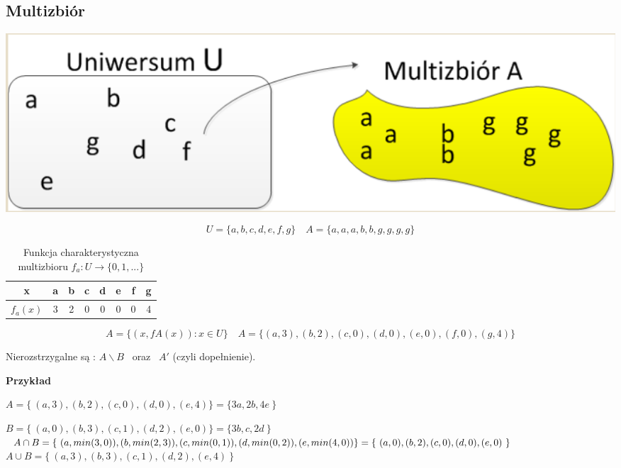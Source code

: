 \subsection{Multizbiór}

\begin{center}
\includegraphics[scale=0.5]{img/multizbior.png}
\end{center}

$$ U = \{a, b, c, d, e, f, g\} \quad A=\{a, a, a, b, b, g, g, g, g\} $$

\begin{table}[!ht]
    \centering
    \caption{Funkcja charakterystyczna multizbioru $ f_a : U \to \{0, 1, ...\} $}
    \begin{adjustbox}{width=0.5\textwidth}
    \begin{tabular}{|c|c|c|c|c|c|c|c|}
        \hline
        x & a & b & c & d & e & f & g \\ \hline
        $f_a(x)$ & 3 & 2 & 0 & 0 & 0 & 0 & 4 \\ \hline
    \end{tabular}
\end{adjustbox}
\end{table}
$$ A=\{(x,fA(x)): x\in U\} \quad A= \{(a,3), (b,2), (c,0), (d,0), (e,0), (f,0), (g,4)\} $$ 

Nierozstrzygalne są : $ A \backslash B $ \ oraz \ $ A' $ (czyli dopełnienie).

\textbf{Przykład}

$ A=\{\ (a,3), (b,2), (c,0), (d,0), (e,4)\} = \{3a,2b,4e\ \} $

$ B=\{\ (a,0), (b,3), (c,1), (d,2), (e,0)\} = \{3b,c,2d\ \} $ \\

$ A \cap B = \{ \ (a,min(3,0)), (b,min(2,3)), (c,min(0,1)), (d,min(0,2)), (e,min(4,0))\} \\ = \{ \ (a,0),(b,2), (c,0), (d,0), (e,0) \ \} $ \\

$ A \cup B = \{ \ (a,3), (b,3), (c,1), (d,2), (e,4) \ \} $